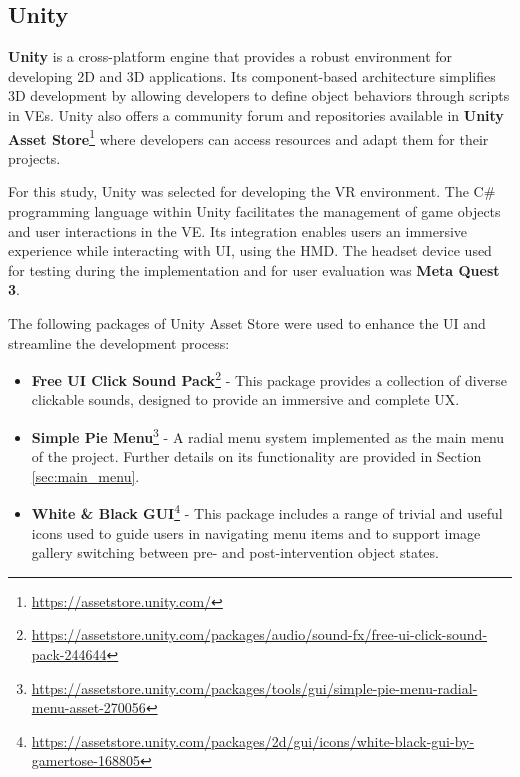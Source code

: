 \subsection{Unity}
\textbf{Unity} is a cross-platform engine that provides a robust environment for developing \gls{2D} and \gls{3D} applications. 
Its component-based architecture simplifies \gls{3D} development by allowing developers to define object behaviors through scripts in \glspl{VE}.
Unity also offers a community forum and repositories available in \textbf{Unity Asset Store}\footnote{\url{https://assetstore.unity.com/}} where developers can access resources and adapt them for their projects.

For this study, Unity was selected for developing the \gls{VR} environment. The C\# programming language within Unity facilitates the management of game objects and user interactions in the \gls{VE}.
Its integration enables users an immersive experience while interacting with \gls{UI}, using the \gls{HMD}. 
The headset device used for testing during the implementation and for user evaluation was \textbf{Meta Quest 3}.

The following packages of Unity Asset Store were used to enhance the \gls{UI} and streamline the development process:

\begin{itemize}
\item{\textbf{Free UI Click Sound Pack}\footnote{\url{https://assetstore.unity.com/packages/audio/sound-fx/free-ui-click-sound-pack-244644}} - This package provides a collection of diverse clickable sounds, designed to provide an immersive and complete \gls{UX}.}
\item{\textbf{Simple Pie Menu}\footnote{\url{https://assetstore.unity.com/packages/tools/gui/simple-pie-menu-radial-menu-asset-270056}}} - A radial menu system implemented as the main menu of the project. Further details on its functionality are provided in Section \ref{sec:main_menu}.
\item{\textbf{White \& Black GUI}\footnote{\url{https://assetstore.unity.com/packages/2d/gui/icons/white-black-gui-by-gamertose-168805}}} - This package includes a range of trivial and useful icons used to guide users in navigating menu items and to support image gallery switching between pre- and post-intervention object states.
\end{itemize}


